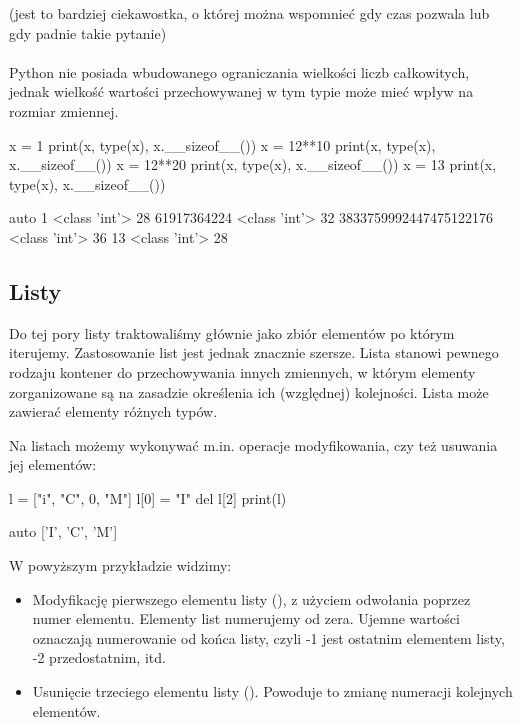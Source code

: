 \documentclass{pdfBooklets}
\begin{document}
\begin{teacherOnly}
(jest to bardziej ciekawostka, o której można wspomnieć gdy czas pozwala lub gdy padnie takie pytanie)\\ \\
Python nie posiada wbudowanego ograniczania wielkości liczb całkowitych, jednak wielkość wartości przechowywanej w tym typie może mieć wpływ na rozmiar zmiennej.

\begin{CodeFrame}[python]{0.45\textwidth}
x = 1
print(x, type(x), x.__sizeof__())
x = 12**10
print(x, type(x), x.__sizeof__())
x = 12**20
print(x, type(x), x.__sizeof__())
x = 13
print(x, type(x), x.__sizeof__())
\end{CodeFrame}
\begin{CodeFrame}{auto}
1 <class 'int'> 28
61917364224 <class 'int'> 32
3833759992447475122176 <class 'int'> 36
13 <class 'int'> 28
\end{CodeFrame}
\end{teacherOnly}

\subsection{Listy}

Do tej pory listy traktowaliśmy głównie jako zbiór elementów po którym iterujemy. Zastosowanie list jest jednak znacznie szersze.
Lista stanowi pewnego rodzaju kontener do przechowywania innych zmiennych, w którym elementy zorganizowane są na zasadzie określenia ich (względnej) kolejności.
Lista może zawierać elementy różnych typów.

Na listach możemy wykonywać m.in. operacje modyfikowania, czy też usuwania jej elementów:

\begin{CodeFrame}[python]{0.50\textwidth}
l = ["i", "C", 0, "M"]
l[0] = "I"
del l[2]
print(l)
\end{CodeFrame}
\begin{CodeFrame}{auto}
['I', 'C', 'M']
\end{CodeFrame}

\noindent W powyższym przykładzie widzimy:
\begin{itemize}
\item Modyfikację pierwszego elementu listy (), z użyciem odwołania poprzez numer elementu.
      Elementy list numerujemy od zera. Ujemne wartości oznaczają numerowanie od końca listy, czyli -1 jest ostatnim elementem listy, -2 przedostatnim, itd.
\item Usunięcie trzeciego elementu listy (). Powoduje to zmianę numeracji kolejnych elementów.
\end{itemize}
\end{document}
